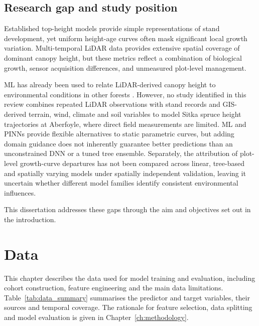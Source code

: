 \documentclass[logo,msc,ai]{infthesis}           %
\begin{document}
\section{Research gap and study position}
\label{sec:background-gap}

Established top-height models provide simple representations of stand development, yet uniform height-age curves often mask significant local growth variation. Multi-temporal LiDAR data provides extensive spatial coverage of dominant canopy height, but these metrics reflect a combination of biological growth, sensor acquisition differences, and unmeasured plot-level management.

ML has already been used to relate LiDAR-derived canopy height to environmental conditions in other forests \cite{fricker2019More_C3_LID}. However, no study identified in this review combines repeated LiDAR observations with stand records and GIS-derived terrain, wind, climate and soil variables to model Sitka spruce height trajectories at Aberfoyle, where direct field measurements are limited. ML and PINNs provide flexible alternatives to static parametric curves, but adding domain guidance does not inherently guarantee better predictions than an unconstrained DNN or a tuned tree ensemble. Separately, the attribution of plot-level growth-curve departures has not been compared across linear, tree-based and spatially varying models under spatially independent validation, leaving it uncertain whether different model families identify consistent environmental influences.

This dissertation addresses these gaps through the aim and objectives set out in the introduction.




\chapter{Data} \label{ch:data}
This chapter describes the data used for model training and evaluation, including cohort construction, feature engineering and the main data limitations. Table~\ref{tab:data_summary} summarises the predictor and target variables, their sources and temporal coverage. The rationale for feature selection, data splitting and model evaluation is given in Chapter~\ref{ch:methodology}.
\end{document}
